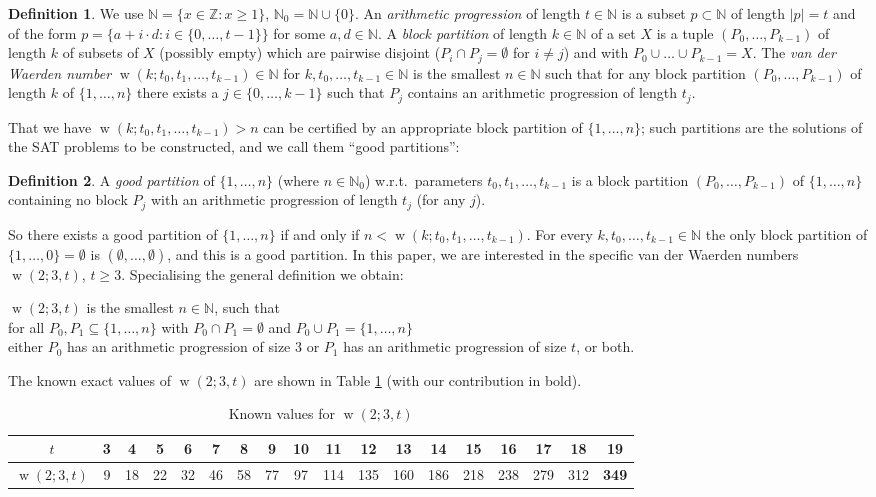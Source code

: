 \documentclass[final,3p,times]{elsarticle}
\theoremstyle{definition}
\newtheorem{defn}{Definition}[section]
\newcommand{\set}[1]{\{#1\}}
\newcommand{\NN}{\mathbb{N}}
\newcommand{\NNZ}{\NN_0}
\newcommand{\ZZ}{\mathbb{Z}}
\providecommand{\abs}[1]{\lvert #1 \rvert}
\DeclareMathOperator{\vdw}{w}
\begin{document}
\begin{defn}\label{def:vdwn}
  We use $\NN = \set{x \in \ZZ : x \ge 1}$, $\NNZ = \NN \cup \set{0}$. An \emph{arithmetic progression} of length $t \in \NN$ is a subset $p \subset \NN$ of length $\abs{p} = t$ and of the form $p = \set{a + i \cdot d : i \in \set{0, \dots, t-1}}$ for some $a, d \in \NN$. A \emph{block partition} of length $k \in \NN$ of a set $X$ is a tuple $(P_0,\dots, P_{k-1})$ of length $k$ of subsets of $X$ (possibly empty) which are pairwise disjoint ($P_i \cap P_j = \emptyset$ for $i \ne j$) and with $P_0 \cup \dots \cup P_{k-1} = X$. The \emph{van der Waerden number} $\vdw(k; t_0, t_1, \dots, t_{k-1}) \in \NN$ for $k, t_0, \dots, t_{k-1} \in \NN$ is the smallest $n \in \NN$ such that for any block partition $(P_0,\dots,P_{k-1})$ of length $k$ of $\set{1,\dots,n}$ there exists a $j \in \set{0,\dots,k-1}$ such that $P_j$ contains an arithmetic progression of length $t_j$.
\end{defn}
That we have $\vdw(k; t_0, t_1, \ldots, t_{k-1}) > n$ can be certified by an appropriate block partition of $\set{1,\dots,n}$; such partitions are the solutions of the SAT problems to be constructed, and we call them ``good partitions'':
\begin{defn}\label{def:goodpart}
  A \emph{good partition} of $\set{1,\dots,n}$ (where $n \in \NNZ$) w.r.t.\ parameters $t_0, t_1, \ldots, t_{k-1}$ is a block partition $(P_0,\dots,P_{k-1})$ of $\set{1,\dots,n}$ containing no block $P_j$ with an arithmetic progression of length $t_j$ (for any $j$).
\end{defn}
So there exists a good partition of $\set{1,\dots,n}$ if and only if $n < \vdw(k; t_0, t_1, \dots, t_{k-1})$. For every $k, t_0, \dots, t_{k-1} \in \NN$ the only block partition of $\set{1,\dots,0} = \emptyset$ is $(\emptyset,\dots,\emptyset)$, and this is a good partition. In this paper, we are interested in the specific van der Waerden numbers $\vdw(2; 3, t)$, $t\geq 3$. Specialising the general definition we obtain:
\begin{center}
  $\vdw(2;3,t)$ is the smallest $n \in \NN$, such that\\
  for all $P_0, P_1 \subseteq \set{1,\dots,n}$ with $P_0 \cap P_1 = \emptyset$ and $P_0 \cup P_1 = \set{1,\dots,n}$\\
  either $P_0$ has an arithmetic progression of size $3$ or $P_1$ has an arithmetic progression of size $t$, or both.
\end{center}
The known exact values of $\vdw(2; 3, t)$ are shown in Table \ref{tab:known3t} (with our contribution in bold).
\begin{table}[H]
  \setlength{\tabcolsep}{5pt}
  \centering
  \begin{tabular}{c|*{17}{c}}
    $t$ & 3 & 4 & 5 & 6 & 7 & 8 & 9 & 10 & 11 & 12 & 13 & 14 & 15 & 16 & 17 & 18 & \textbf{19}\\
    \hline
    $\vdw(2;3,t)$ & 9 & 18 & 22 & 32 & 46 & 58 & 77 & 97 & 114 & 135 & 160 & 186 & 218 & 238 & 279 & 312 & \textbf{349}
  \end{tabular}
  \caption{Known values for $\vdw(2;3,t)$}
  \label{tab:known3t}
\end{table}
\end{document}
